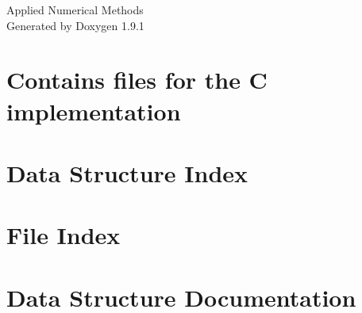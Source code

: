 \let\mypdfximage\pdfximage\def\pdfximage{\immediate\mypdfximage}\documentclass[twoside]{book}
\newcommand{\+}{\discretionary{\mbox{\scriptsize$\hookleftarrow$}}{}{}}
\newcommand{\clearemptydoublepage}{%
  \newpage{\pagestyle{empty}\cleardoublepage}%
}
\begin{document}
\raggedbottom

\begin{titlepage}
\vspace*{7cm}
\begin{center}%
{\Large Applied Numerical Methods }\\
\vspace*{1cm}
{\large Generated by Doxygen 1.9.1}\\
\end{center}
\end{titlepage}
\clearemptydoublepage
{}
\tableofcontents
\clearemptydoublepage
{}

\chapter{Contains files for the C implementation}
\label{md__c___users__dhyeya__desktop__s_d_l_c__project_sdlc_team_4_3__implementation__r_e_a_d_m_e}

\chapter{Data Structure Index}

\chapter{File Index}

\chapter{Data Structure Documentation}































\end{document}
